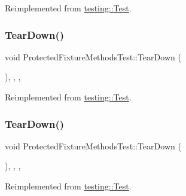 Reimplemented from \mbox{\hyperlink{classtesting_1_1_test_a190315150c303ddf801313fd1a777733}{testing\+::\+Test}}.

\mbox{\label{class_protected_fixture_methods_test_a826369510d499ffcab66649f7315e8cd}} 
\subsubsection{\texorpdfstring{TearDown()}{TearDown()}\hspace{0.1cm}{\footnotesize\ttfamily [1/3]}}
{\footnotesize\ttfamily void Protected\+Fixture\+Methods\+Test\+::\+Tear\+Down (\begin{DoxyParamCaption}{ }\end{DoxyParamCaption})\hspace{0.3cm}{\ttfamily [inline]}, {\ttfamily [override]}, {\ttfamily [protected]}, {\ttfamily [virtual]}}



Reimplemented from \mbox{\hyperlink{classtesting_1_1_test_a5f0ab439802cbe0ef7552f1a9f791923}{testing\+::\+Test}}.

\mbox{\label{class_protected_fixture_methods_test_a826369510d499ffcab66649f7315e8cd}} 
\subsubsection{\texorpdfstring{TearDown()}{TearDown()}\hspace{0.1cm}{\footnotesize\ttfamily [2/3]}}
{\footnotesize\ttfamily void Protected\+Fixture\+Methods\+Test\+::\+Tear\+Down (\begin{DoxyParamCaption}{ }\end{DoxyParamCaption})\hspace{0.3cm}{\ttfamily [inline]}, {\ttfamily [override]}, {\ttfamily [protected]}, {\ttfamily [virtual]}}



Reimplemented from \mbox{\hyperlink{classtesting_1_1_test_a5f0ab439802cbe0ef7552f1a9f791923}{testing\+::\+Test}}.

